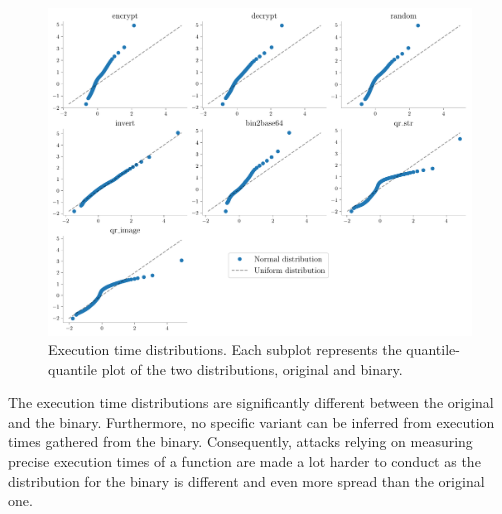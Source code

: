 \begin{figure}[h]
    \includegraphics[width=\linewidth]{plots/qqplots.pdf}
    \caption{Execution time distributions. Each subplot represents the quantile-quantile plot of the two distributions, original and binary. }
    \label{rq3:diversity:times}
\end{figure}



\begin{tcolorbox}[title=Answer to RQ3.,boxrule=2pt,arc=.3em,boxsep=1.5mm]
    
The execution time distributions are significantly different between the original and the binary. Furthermore, no specific variant can be inferred from execution times gathered from the binary. 
Consequently, attacks relying on measuring precise execution times \cite{blackhatpaper} of a function are made a lot harder to conduct as the distribution for the binary is different and even more spread than the original one.

\end{tcolorbox}
